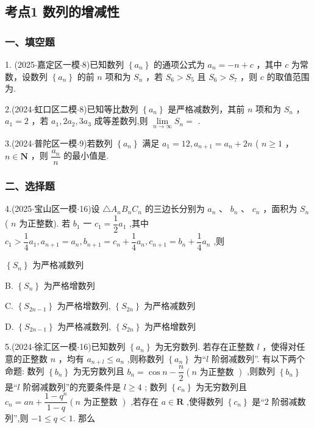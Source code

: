 \subsection*{考点1 数列的增减性}

\subsubsection*{一、填空题}

1. (2025$\cdot$嘉定区一模$\cdot$8)已知数列 $\left\{  {a}_{n}\right\}$ 的通项公式为 ${a}_{n} =  - n + c$ ，其中 $c$ 为常数，设数列 $\left\{  {a}_{n}\right\}$ 的前 $n$ 项和为 ${S}_{n}$ ，若 ${S}_{6} > {S}_{5}$ 且 ${S}_{6} > {S}_{7}$ ，则 $c$ 的取值范围为\blkda[2]{}.

2.(2024$\cdot$虹口区二模$\cdot$8)已知等比数列 $\left\{  {a}_{n}\right\}$ 是严格减数列，其前 $n$ 项和为 ${S}_{n}$ ， ${a}_{1} = 2$ ，若 ${a}_{1},2{a}_{2},3{a}_{3}$ 成等差数列,则 $\mathop{\lim }\limits_{{n \rightarrow  \infty }}{S}_{n} =$ \blkda[2]{}.

3.(2024$\cdot$普陀区一模$\cdot$9)若数列 $\left\{  {a}_{n}\right\}$ 满足 ${a}_{1} = {12},{a}_{n + 1} = {a}_{n} + {2n}$ ( $n \geq  1$ ， $n \in  \mathbf{N}$ ，则 $\dfrac{{a}_{n}}{n}$ 的最小值是\blkda[2]{}.

\subsubsection*{二、选择题}

4.(2025$\cdot$宝山区一模$\cdot$16)设 $\bigtriangleup {A}_{n}{B}_{n}{C}_{n}$ 的三边长分别为 ${a}_{n}$ 、 ${b}_{n}$ 、 ${c}_{n}$ ，面积为 ${S}_{n}$ ( $n$ 为正整数). 若 ${b}_{1}$ 一 ${c}_{1} = \dfrac{1}{2}{a}_{1}$ ,其中 ${c}_{1} > \dfrac{1}{4}{a}_{1},{a}_{n + 1} = {a}_{n},{b}_{n + 1} = {c}_{n} + \dfrac{1}{4}{a}_{n},{c}_{n + 1} = {b}_{n} + \dfrac{1}{4}{a}_{n}$ ,则 \dotfill{(\kh{})}

\xx{}{}{}{}$\left\{  {S}_{n}\right\}$ 为严格减数列

B. $\left\{  {S}_{n}\right\}$ 为严格增数列

C. $\left\{  {S}_{{2n} - 1}\right\}$ 为严格增数列, $\left\{  {S}_{2n}\right\}$ 为严格减数列

D. $\left\{  {S}_{{2n} - 1}\right\}$ 为严格减数列, $\left\{  {S}_{2n}\right\}$ 为严格增数列

5.(2024$\cdot$徐汇区一模$\cdot$16)已知数列 $\left\{  {a}_{n}\right\}$ 为无穷数列. 若存在正整数 $l$ ，使得对任意的正整数 $n$ ，均有 ${a}_{n + l} \leq  {a}_{n}$ ,则称数列 $\left\{  {a}_{n}\right\}$ 为“$l$ 阶弱减数列”. 有以下两个命题:   数列 $\left\{  {b}_{n}\right\}$ 为无穷数列且 ${b}_{n} =  \cos n - \dfrac{n}{2}\left( {n\text{ 为正整数 }}\right)$ ,则数列 $\left\{  {b}_{n}\right\}$ 是“$l$ 阶弱减数列”的充要条件是 $l \geq  4$ ;    数列 $\left\{  {c}_{n}\right\}$ 为无穷数列且 ${c}_{n} = {an} + \dfrac{1 - {q}^{n}}{1 - q}\left( {n\text{ 为正整数 }}\right)$ ,若存在 $a \in  \mathbf{R}$ ,使得数列 $\left\{  {c}_{n}\right\}$ 是“2 阶弱减数列”,则 $- 1 \leq  q < 1$. 那么 \dotfill{(\kh{})}

